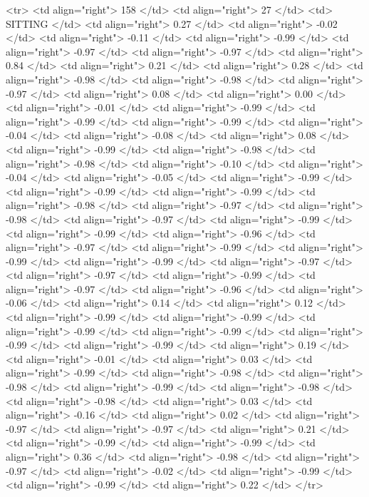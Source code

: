   <tr> <td align="right"> 158 </td> <td align="right">  27 </td> <td> SITTING </td> <td align="right"> 0.27 </td> <td align="right"> -0.02 </td> <td align="right"> -0.11 </td> <td align="right"> -0.99 </td> <td align="right"> -0.97 </td> <td align="right"> -0.97 </td> <td align="right"> 0.84 </td> <td align="right"> 0.21 </td> <td align="right"> 0.28 </td> <td align="right"> -0.98 </td> <td align="right"> -0.98 </td> <td align="right"> -0.97 </td> <td align="right"> 0.08 </td> <td align="right"> 0.00 </td> <td align="right"> -0.01 </td> <td align="right"> -0.99 </td> <td align="right"> -0.99 </td> <td align="right"> -0.99 </td> <td align="right"> -0.04 </td> <td align="right"> -0.08 </td> <td align="right"> 0.08 </td> <td align="right"> -0.99 </td> <td align="right"> -0.98 </td> <td align="right"> -0.98 </td> <td align="right"> -0.10 </td> <td align="right"> -0.04 </td> <td align="right"> -0.05 </td> <td align="right"> -0.99 </td> <td align="right"> -0.99 </td> <td align="right"> -0.99 </td> <td align="right"> -0.98 </td> <td align="right"> -0.97 </td> <td align="right"> -0.98 </td> <td align="right"> -0.97 </td> <td align="right"> -0.99 </td> <td align="right"> -0.99 </td> <td align="right"> -0.96 </td> <td align="right"> -0.97 </td> <td align="right"> -0.99 </td> <td align="right"> -0.99 </td> <td align="right"> -0.99 </td> <td align="right"> -0.97 </td> <td align="right"> -0.97 </td> <td align="right"> -0.99 </td> <td align="right"> -0.97 </td> <td align="right"> -0.96 </td> <td align="right"> -0.06 </td> <td align="right"> 0.14 </td> <td align="right"> 0.12 </td> <td align="right"> -0.99 </td> <td align="right"> -0.99 </td> <td align="right"> -0.99 </td> <td align="right"> -0.99 </td> <td align="right"> -0.99 </td> <td align="right"> -0.99 </td> <td align="right"> 0.19 </td> <td align="right"> -0.01 </td> <td align="right"> 0.03 </td> <td align="right"> -0.99 </td> <td align="right"> -0.98 </td> <td align="right"> -0.98 </td> <td align="right"> -0.99 </td> <td align="right"> -0.98 </td> <td align="right"> -0.98 </td> <td align="right"> 0.03 </td> <td align="right"> -0.16 </td> <td align="right"> 0.02 </td> <td align="right"> -0.97 </td> <td align="right"> -0.97 </td> <td align="right"> 0.21 </td> <td align="right"> -0.99 </td> <td align="right"> -0.99 </td> <td align="right"> 0.36 </td> <td align="right"> -0.98 </td> <td align="right"> -0.97 </td> <td align="right"> -0.02 </td> <td align="right"> -0.99 </td> <td align="right"> -0.99 </td> <td align="right"> 0.22 </td> </tr>

